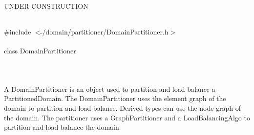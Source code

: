 
UNDER CONSTRUCTION

   \\
\indent \#include $<\tilde{ }$/domain/partitioner/DomainPartitioner.h$>$  \\

  \\
\indent class DomainPartitioner \\

 \\
 \\


  \\
\indent A DomainPartitioner is an object used to partition and load balance
a PartitionedDomain. The DomainPartitioner uses the element graph of
the domain to partition and load balance. Derived types can use the
node graph of the domain. The partitioner uses a GraphPartitioner and
a LoadBalancingAlgo to partition and load balance the domain. \\

